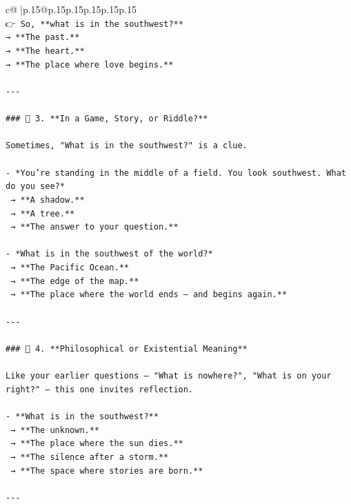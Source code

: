 \documentclass{article}
\begin{document}
{\begin{supertabular}{c@{$\;$}|p{.15\linewidth}@{}p{.15\linewidth}p{.15\linewidth}p{.15\linewidth}p{.15\linewidth}p{.15\linewidth}}
{{{\\ 
\texttt{👉 So, **what is in the southwest?**  } \\
\texttt{→ **The past.**  } \\
\texttt{→ **The heart.**  } \\
\texttt{→ **The place where love begins.**} \\
\\ 
\texttt{{-}{-}{-}} \\
\\ 
\texttt{\#\#\# 🔹 3. **In a Game, Story, or Riddle?**} \\
\\ 
\texttt{Sometimes, "What is in the southwest?" is a clue.} \\
\\ 
\texttt{{-} *You’re standing in the middle of a field. You look southwest. What do you see?*  } \\
\texttt{  → **A shadow.**  } \\
\texttt{  → **A tree.**  } \\
\texttt{  → **The answer to your question.**} \\
\\ 
\texttt{{-} *What is in the southwest of the world?*  } \\
\texttt{  → **The Pacific Ocean.**  } \\
\texttt{  → **The edge of the map.**  } \\
\texttt{  → **The place where the world ends — and begins again.**} \\
\\ 
\texttt{{-}{-}{-}} \\
\\ 
\texttt{\#\#\# 🔹 4. **Philosophical or Existential Meaning**} \\
\\ 
\texttt{Like your earlier questions — "What is nowhere?", "What is on your right?" — this one invites reflection.} \\
\\ 
\texttt{{-} **What is in the southwest?**  } \\
\texttt{  → **The unknown.**  } \\
\texttt{  → **The place where the sun dies.**  } \\
\texttt{  → **The silence after a storm.**  } \\
\texttt{  → **The space where stories are born.**} \\
\\ 
\texttt{{-}{-}{-}} \\
}}}
\end{supertabular}}
\end{document}
